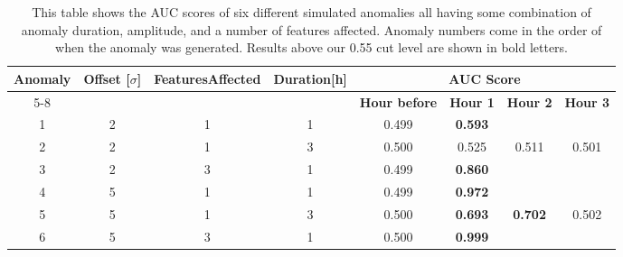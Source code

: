 \documentclass[5p]{elsarticle}
\begin{document}
\begin{table}[htbp]
\centering
\caption{This table shows the AUC scores of six different simulated anomalies all having some combination of anomaly duration, amplitude, and a number of features affected. Anomaly numbers come in the order of when the anomaly was generated. Results above our 0.55 cut level are shown in bold letters.}
\label{table:bdtonfixed}
\resizebox{\linewidth}{!} {%
\begin{tabular}{@{}cccccccc@{}}
\toprule
\multirow{2}{*}{\textbf{Anomaly}} & \multirow{2}{*}{\textbf{Offset {[}$\sigma${]}}} & \multirow{2}{*}{\textbf{Features\newline Affected}} & \multirow{2}{*}{\textbf{Duration{[}h{]}}} & \multicolumn{4}{c}{\textbf{AUC Score}}                                     \\ \cmidrule(l){5-8} 
                                  &                                                 &                                             &                                           & \textbf{Hour before} & \textbf{Hour 1} & \textbf{Hour 2} & \textbf{Hour 3} \\ \midrule
1                                 & 2                                               & 1                                           & 1                                         & 0.499                & \textbf{0.593}  &                 &                 \\
2                                 & 2                                               & 1                                           & 3                                         & 0.500                & 0.525  & 0.511  & 0.501           \\
3                                 & 2                                               & 3                                           & 1                                         & 0.499                & \textbf{0.860}  &                 &                 \\
4                                 & 5                                               & 1                                           & 1                                         & 0.499                & \textbf{0.972}  &                 &                 \\
5                                 & 5                                               & 1                                           & 3                                         & 0.500                & \textbf{0.693}  & \textbf{0.702}  & 0.502           \\
6                                 & 5                                               & 3                                           & 1                                         & 0.500                & \textbf{0.999}  &                 &                 \\ 
\bottomrule
\end{tabular}%
}
\end{table}
\end{document}

